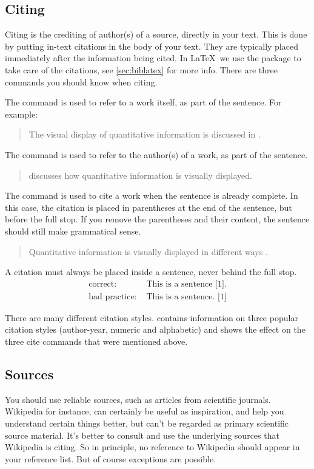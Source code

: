 \subsection{Citing}
Citing is the crediting of author(s) of a source, directly in your text. This is done by putting in-text citations in the body of your text. They are typically placed immediately after the information being cited. In \LaTeX\ we use the package  to take care of the citations, see \cref{sec:biblatex} for more info. There are three commands you should know when citing.

The  command is used to refer to a work itself, as part of the sentence. For example:

\begin{quotation}
The visual display of quantitative information is discussed in \cite{tufte2001}.
\end{quotation}

The  command is used to refer to the author(s) of a work, as part of the sentence.
\begin{quotation}
 \textcite{tufte2001} discusses how quantitative information is visually displayed.
\end{quotation}

The  command is used to cite a work when the sentence is already complete. In this case, the citation is placed in parentheses at the end of the sentence, but before the full stop. If you remove the parentheses and their content, the sentence should still make grammatical sense.
\begin{quotation}
 Quantitative information is visually displayed in different ways \parencite{tufte2001}.
\end{quotation}

A citation must always be placed inside a sentence, never behind the full stop.
\begin{align*}
    \text{correct:  }      &\text{This is a sentence [1].} \\
    \text{bad practice:  } &\text{This is a sentence. [1]}
\end{align*}



There are many different citation styles.  contains information on three popular citation styles (author-year, numeric and alphabetic) and shows the effect on the three cite commands that were mentioned above.

\subsection{Sources}
You should use reliable sources, such as articles from scientific journals. Wikipedia for instance, can certainly be useful as inspiration, and help you understand certain things better, but can't be regarded as primary scientific source material. It's better to consult and use the underlying sources that Wikipedia is citing. So in principle, no reference to Wikipedia should appear in your reference list. But of course exceptions are possible.

